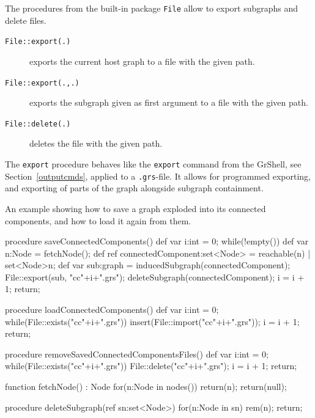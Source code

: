 The procedures from the built-in package \texttt{File} allow to export subgraphs and delete files.

\begin{description}
\item[\texttt{File::export(.)}] exports the current host graph to a file with the given path.
\item[\texttt{File::export(.,.)}] exports the subgraph given as first argument to a file with the given path.
\item[\texttt{File::delete(.)}] deletes the file with the given path.
\end{description}

The \texttt{export} procedure behaves like the \texttt{export} command from the GrShell, see Section~\ref{outputcmds}, applied to a \texttt{.grs}-file. It allows for programmed exporting, and exporting of parts of the graph alongside subgraph containment.


\begin{example}
An example showing how to save a graph exploded into its connected components, and how to load it again from them.
\begin{grgen}
procedure saveConnectedComponents()
{
	def var i:int = 0;
	while(!empty()) {
		def var n:Node = fetchNode();
		def ref connectedComponent:set<Node> = reachable(n) | set<Node>{n};
		def var sub:graph = inducedSubgraph(connectedComponent);
		File::export(sub, "cc"+i+".grs");
		deleteSubgraph(connectedComponent);
		i = i + 1;
	}
	return;
}

procedure loadConnectedComponents()
{
	def var i:int = 0;
	while(File::exists("cc"+i+".grs")) {
		insert(File::import("cc"+i+".grs"));
		i = i + 1;
	}
	return;
}

procedure removeSavedConnectedComponentsFiles()
{
	def var i:int = 0;
	while(File::exists("cc"+i+".grs")) {
		File::delete("cc"+i+".grs");
		i = i + 1;
	}
	return;
}

function fetchNode() : Node
{
	for(n:Node in nodes()) {
		return(n);
	}
	return(null);
}

procedure deleteSubgraph(ref sn:set<Node>)
{
	for(n:Node in sn) {
		rem(n);
	}
	return;
}
\end{grgen}
\end{example}


